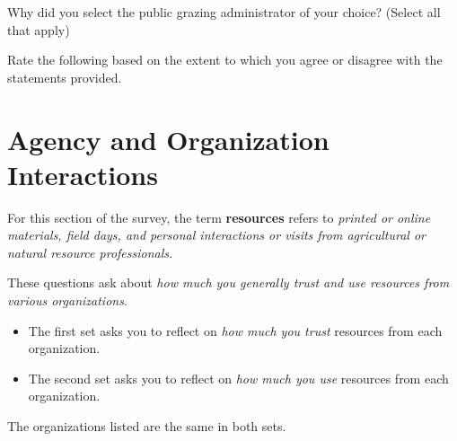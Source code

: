 \documentclass[
  english,
  checkmode = fill,
  ]{sdapsclassic}
\begin{document}
\begin{questionnaire}
    \begin{choicequestion}[cols=3]{Why did you select the public grazing administrator of your choice? (Select all that apply)}
    \end{choicequestion}
    
    
     \begin{markgroup}[rowsep=0.33em]{Rate the following based on the extent to which you agree or disagree with the statements provided.}
       {}~{}
       {}~{}
       {}~{}
       {}~{}
       {}~{}
       {}~{}
    \end{markgroup}    
    
    \section{Agency and Organization Interactions}
    
 For this section of the survey, the term \textbf{resources} refers to \emph{printed or online materials, field days, and personal interactions or visits from agricultural or natural resource professionals.}

These questions ask about \emph{how much you generally trust and use resources from various organizations}. 
	\begin{itemize}
		\item The first set asks you to reflect on \emph{how much you trust} resources from each organization. 
		\item The second set asks you to reflect on \emph{how much you use} resources from each organization.  
	\end{itemize}
The organizations listed are the same in both sets.


\end{questionnaire}
\end{document}
